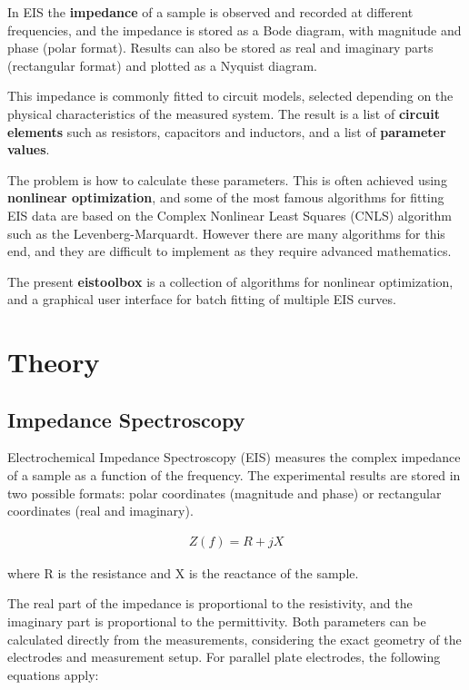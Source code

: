 \documentclass[9pt,a4paper,oneside]{book}
\begin{document}
In EIS the \textbf{impedance} of a sample is observed and recorded at different frequencies, and the impedance is stored as a Bode diagram, with magnitude and phase (polar format). Results can also be stored as real and imaginary parts (rectangular format) and plotted as a Nyquist diagram.

This impedance is commonly fitted to circuit models, selected depending on the physical characteristics of the measured system. The result is a list of \textbf{circuit elements} such as resistors, capacitors and inductors, and a list of \textbf{parameter values}.

The problem is how to calculate these parameters. This is often achieved using \textbf{nonlinear optimization}, and some of the most famous algorithms for fitting EIS data are based on the Complex Nonlinear Least Squares (CNLS) algorithm such as the Levenberg-Marquardt. However there are many algorithms for this end, and they are difficult to implement as they require advanced mathematics.

The present \textbf{eistoolbox} is a collection of algorithms for nonlinear optimization, and a graphical user interface for batch fitting of multiple EIS curves.

\chapter{Theory}


\section{Impedance Spectroscopy}

Electrochemical Impedance Spectroscopy (EIS) measures the complex impedance of a sample as a function of the frequency. The experimental results are stored in two possible formats: polar coordinates (magnitude and phase) or rectangular coordinates (real and imaginary).

\begin{align} \label{impedance}
	Z(f) = R + jX
\end{align}

where R is the resistance and X is the reactance of the sample.

The real part of the impedance is proportional to the resistivity, and the imaginary part is proportional to the permittivity. Both parameters can be calculated directly from the measurements, considering the exact geometry of the electrodes and measurement setup. For parallel plate electrodes, the following equations apply:
\end{document}
